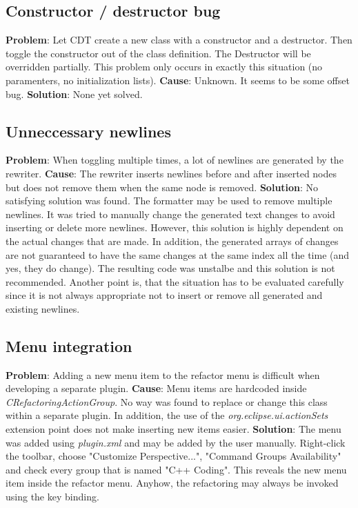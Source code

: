 \subsection{Constructor / destructor bug}
\textbf{Problem}: Let CDT create a new class with a constructor and a destructor. 
Then toggle the constructor out of the class definition. The Destructor will be 
overridden partially. This problem only occurs in exactly this situation (no 
paramenters, no initialization lists).
\textbf{Cause}: Unknown. It seems to be some offset bug.
\textbf{Solution}: None yet solved.

\subsection{Unneccessary newlines}
\textbf{Problem}: When toggling multiple times, a lot of newlines are generated 
by the rewriter.
\textbf{Cause}: The rewriter inserts newlines before and after inserted nodes 
but does not remove them when the same node is removed.
\textbf{Solution}: No satisfying solution was found. The formatter may be used 
to remove multiple newlines. It was tried to manually change the generated text 
changes to avoid inserting or delete more newlines. However, this solution is 
highly dependent on the actual changes that are made. In addition, the generated 
arrays of changes are not guaranteed to have the same changes at the same index 
all the time (and yes, they do change). The resulting code was unstalbe and this 
solution is not recommended. Another point is, that the situation has to be 
evaluated carefully since it is not always appropriate not to insert or remove 
all generated and existing newlines.

\subsection{Menu integration}
\textbf{Problem}: Adding a new menu item to the refactor menu is difficult when 
developing a separate plugin.
\textbf{Cause}: Menu items are hardcoded inside 
\textit{CRefactoringActionGroup}. No way was found to replace or change this 
class within a separate plugin. In addition, the use of the 
\textit{org.eclipse.ui.actionSets} extension point does not make inserting new 
items easier.
\textbf{Solution}: The menu was added using \textit{plugin.xml} and may be added 
by the user manually. Right-click the toolbar, choose "Customize Perspective...", 
"Command Groups Availability" and check every group that is named "C++ Coding". 
This reveals the new menu item inside the refactor menu. Anyhow, the refactoring 
may always be invoked using the key binding.

